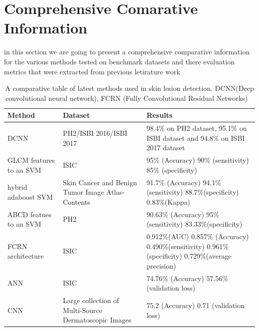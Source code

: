 \section{Comprehensive Comarative Information}
in this section we are going to present a comprehensive comparative information for the various methods tested on benchmark datasets and there evaluation metrics that were extracted from previous letirature work
\bigskip
\begin{table}[htbp]
    \begin{center}
        \begin{tabular}{p{3cm}|p{3cm}|p{6cm}}
        \hline 
        Method & Dataset & Results  \\ 
        \hline 
         DCNN & PH2/ISBI 2016/ISBI 2017 & 98.4\% on PH2 dataset, 95.1\% on ISBI dataset and 94.8\% on ISBI 2017 dataset \\ 
        \hline 
         GLCM features to an SVM & ISIC & 95\% (Accuracy) 90\% (sensitivity) 85\% (specificity) \\ 
        \hline 
            hybrid adaboost SVM  & Skin Cancer and Benign Tumor Image Atlas-Contents & 91.7\% (Accuracy) 94.1\%(sensitivity) 88.7\%(specificity) 0.83\%(Kappa) \\ 
        \hline 
            ABCD featues to an SVM & PH2 & 90.63\% (Accuracy) 95\% (sensitivity) 83.33\%(specificity) \\ 
        \hline 
         FCRN architecture & ISIC & 0.912\%(AUC) 0.857\% (Accuracy) 0.490\%(sensitivity) 0.961\%(specificity) 0.729\%(average precision) \\ 
        \hline 
         ANN & ISIC & 74.76\% (Accuracy) 57.56\% (validation loss) \\ 
        \hline 
         CNN & Large collection of Multi-Source Dermatoscopic Images & 75.2 (Accuracy) 0.71 (validation loss) \\ 
        \hline 
        \end{tabular} 
    \end{center}
    \caption{A comparative table of latest methods used in skin lesion detection. DCNN(Deep convolutional neural network), FCRN (Fully Convolutional Residual Networks) ~\cite{}}
    \label{tab:}
    \end{table}






